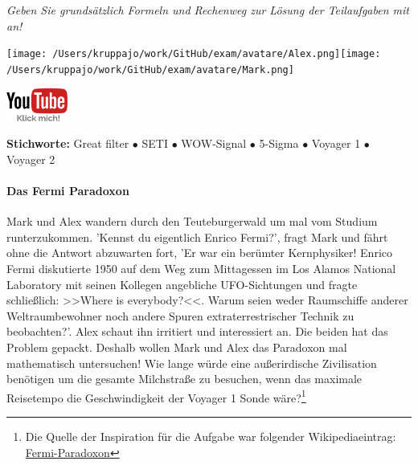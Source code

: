 \documentclass[a4paper, 9pt]{scrartcl}\usepackage[]{graphicx}\usepackage[]{xcolor}
\begin{document}
\textit{Geben Sie grundsätzlich Formeln und Rechenweg zur Lösung der Teilaufgaben mit an!} \\[1Ex]
 

 
\ifcollection
\begin{flushright}
\tiny\vspace{-3Ex}
\textbf{\examinhaltstart}
\exammodulemathstat
\vspace{-4Ex}
\end{flushright}
\begin{minipage}[t]{0.5\textwidth}
\texttt{[image: /Users/kruppajo/work/GitHub/exam/avatare/Alex.png]}\hspace{-4mm}\texttt{[image: /Users/kruppajo/work/GitHub/exam/avatare/Mark.png]}
\end{minipage}
\begin{minipage}[t]{0.5\textwidth}
\hfill
\href{https://youtu.be/iCQogS6KhPM}{\includegraphics[width = 2cm]{img/youtube}}
\end{minipage}
\fi

{\tiny\textbf{Stichworte:} Great filter $\bullet$ SETI $\bullet$ WOW-Signal $\bullet$ 5-Sigma $\bullet$ Voyager 1 $\bullet$ Voyager 2}




\ifcollection
\paragraph{Das Fermi Paradoxon}
\fi



Mark und Alex wandern durch den Teuteburgerwald um mal vom Studium runterzukommen. 'Kennst du eigentlich Enrico Fermi?', fragt Mark und fährt ohne die Antwort abzuwarten fort, 'Er war ein berümter Kernphysiker! Enrico Fermi diskutierte 1950 auf dem Weg zum Mittagessen im Los Alamos National Laboratory mit seinen Kollegen angebliche UFO-Sichtungen und fragte schließlich: >>Where is everybody?<<. Warum seien weder Raumschiffe anderer Weltraumbewohner noch andere Spuren extraterrestrischer Technik zu beobachten?'. Alex schaut ihn irritiert und interessiert an. Die beiden hat das Problem gepackt. Deshalb wollen Mark und Alex das Paradoxon mal mathematisch untersuchen! Wie lange würde eine außerirdische Zivilisation benötigen um die gesamte Milchstraße zu besuchen, wenn das maximale Reisetempo die Geschwindigkeit der Voyager 1 Sonde wäre?\footnote{Die Quelle der Inspiration für die Aufgabe war folgender Wikipediaeintrag: \href{https://de.wikipedia.org/wiki/Fermi-Paradoxon}{Fermi-Paradoxon}}\\[-1ex]
\end{document}

